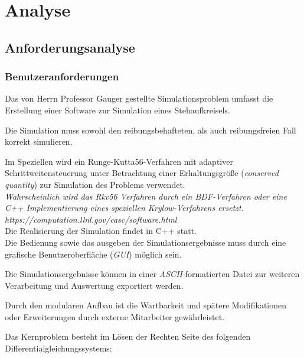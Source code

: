 \chapter{Analyse}
\label{ch:2}

\section{Anforderungsanalyse}
\label{sec:2.1}

\subsection{Benutzeranforderungen}

{Das von Herrn Professor Gauger gestellte Simulationsproblem umfasst die Erstellung einer Software zur Simulation eines Stehaufkreisels.

Die Simulation muss sowohl den reibungsbehafteten, als auch reibungsfreien Fall korrekt simulieren.

Im Speziellen wird ein Runge-Kutta56-Verfahren mit adaptiver Schrittweitensteuerung unter Betrachtung einer Erhaltungsgröße (\textit{conserved quantity}) zur Simulation des Problems verwendet.\\ 
\textit{Wahrscheinlich wird das Rkv56 Verfahren durch ein BDF-Verfahren oder eine C++ Implementierung eines speziellen Krylow-Verfahrens ersetzt.\\
https://computation.llnl.gov/casc/software.html } \\ 
Die Realisierung der Simulation findet in C++ statt. \\

Die Bedienung sowie das ausgeben der Simulationsergebnisse muss durch eine grafische Benutzeroberfl\"ache (\textit{GUI}) m\"oglich sein.

Die Simulationsergebnisse k\"onnen in einer \textit{ASCII}-formatierten Datei zur weiteren Verarbeitung und Auswertung exportiert werden.

Durch den modularen Aufbau ist die Wartbarkeit und sp\"atere Modifikationen oder Erweiterungen durch externe Mitarbeiter gew\"ahrleistet. 
 

Das Kernproblem besteht im L\"osen der Rechten Seite des folgenden Differentialgleichungssystems:

}
